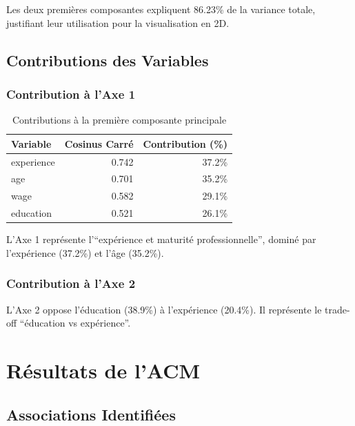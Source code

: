 \documentclass[12pt,a4paper]{report}
\begin{document}
Les deux premières composantes expliquent 86.23\% de la variance totale, justifiant leur utilisation pour la visualisation en 2D.

\subsection{Contributions des Variables}

\subsubsection{Contribution à l'Axe 1}

\begin{table}[H]
\centering
\caption{Contributions à la première composante principale}
\begin{tabular}{|l|r|r|}
\hline
\textbf{Variable} & \textbf{Cosinus Carré} & \textbf{Contribution (\%)} \\
\hline
experience & 0.742 & 37.2\% \\
\hline
age & 0.701 & 35.2\% \\
\hline
wage & 0.582 & 29.1\% \\
\hline
education & 0.521 & 26.1\% \\
\hline
\end{tabular}
\end{table}

L'Axe 1 représente l'``expérience et maturité professionnelle'', dominé par l'expérience (37.2\%) et l'âge (35.2\%).

\subsubsection{Contribution à l'Axe 2}

L'Axe 2 oppose l'éducation (38.9\%) à l'expérience (20.4\%). Il représente le trade-off ``éducation vs expérience''.

\section{Résultats de l'ACM}

\subsection{Associations Identifiées}
\end{document}
